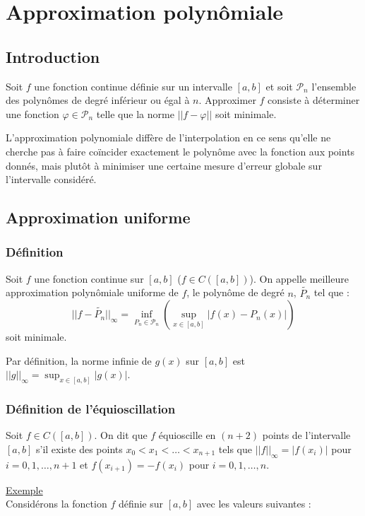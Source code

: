 \section{Approximation polynômiale}
\subsection{Introduction}
Soit $f$ une fonction continue définie sur un intervalle $[a,b]$ et soit $\mathcal{P}_n$ l'ensemble des polynômes de degré inférieur ou égal à $n$. Approximer $f$ consiste à déterminer une fonction $\varphi \in \mathcal{P}_n$ telle que la norme $||f-\varphi||$ soit minimale.

L'approximation polynomiale diffère de l'interpolation en ce sens qu'elle ne cherche pas à faire coïncider exactement le polynôme avec la fonction aux points donnés, mais plutôt à minimiser une certaine mesure d'erreur globale sur l'intervalle considéré.

\subsection{Approximation uniforme}
\subsubsection*{Définition}
Soit $f$ une fonction continue sur $[a,b]$ ($f \in C([a,b])$). On appelle meilleure approximation polynômiale uniforme de $f$, le polynôme de degré $n$, $\tilde{P_n}$ tel que :
$$||f-\tilde{P_n}||_\infty = \inf_{P_n \in \mathcal{P}_n} \left( \sup_{x \in [a,b]} |f(x)-P_n(x)| \right)$$
soit minimale.

Par définition, la norme infinie de $g(x)$ sur $[a,b]$ est $||g||_\infty = \sup_{x\in [a,b]}|g(x)|$.

\subsubsection*{Définition de l'équioscillation}
Soit $f \in C([a,b])$. On dit que $f$ équioscille en $(n+2)$ points de l'intervalle $[a,b]$ s'il existe des points $x_0 < x_1 < \ldots < x_{n+1}$ tels que $||f||_\infty = |f(x_i)|$ pour $i = 0,1,\ldots,n+1$ et $f(x_{i+1}) = -f(x_i)$ pour $i = 0,1,\ldots,n$.

\underline{Exemple} \\
Considérons la fonction $f$ définie sur $[a,b]$ avec les valeurs suivantes :

